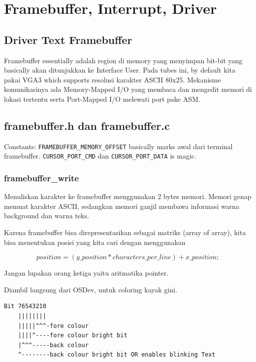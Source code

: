 \chapter{Framebuffer, Interrupt, Driver}

\section{Driver Text Framebuffer}

Framebuffer essentially adalah region di memory yang menyimpan bit-bit yang basically akan ditunjukkan ke Interface User. Pada tubes ini, by default kita pakai VGA3 which supports resolusi karakter ASCII 80x25. Mekanisme komunikasinya ada Memory-Mapped I/O yang membaca dan mengedit memori di lokasi tertentu serta Port-Mapped I/O melewati port pake ASM.

\section{framebuffer.h dan framebuffer.c}

Constants: \texttt{FRAMEBUFFER\_MEMORY\_OFFSET} basically marks awal dari terminal framebuffer. \texttt{CURSOR\_PORT\_CMD} dan \texttt{CURSOR\_PORT\_DATA} is magic.

\subsection{framebuffer\_write}

Menuliskan karakter ke framebuffer menggunakan 2 bytes memori. Memori genap memuat karakter ASCII, sedangkan memori ganjil membawa informasi warna background dan warna teks.

Karena framebuffer bisa direpresentasikan sebagai matriks (array of array), kita bisa menentukan posisi yang kita cari dengan menggunakan

\[
position = (y\_position * characters\_per\_line) + x\_position;
\]

Jangan lupakan orang ketiga yaitu aritmatika pointer.

Diambil langsung dari OSDev, untuk coloring kayak gini.

\begin{lstlisting}[basicstyle=\ttfamily, columns=fixed, keepspaces=true]
Bit 76543210
    ||||||||
    |||||^^^-fore colour
    ||||^----fore colour bright bit
    |^^^-----back colour
    ^--------back colour bright bit OR enables blinking Text
\end{lstlisting}

